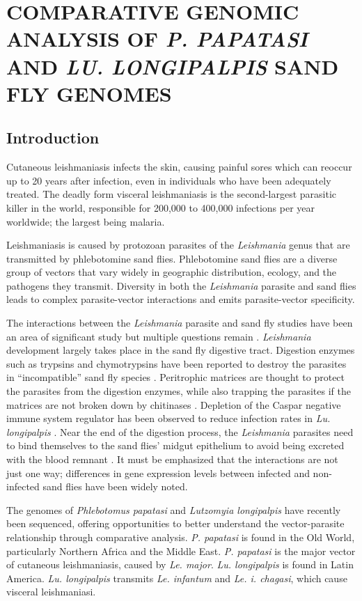 \chapter{\uppercase{Comparative Genomic Analysis of \emph{P. papatasi} and \emph{Lu. longipalpis} Sand Fly Genomes}}

\section{Introduction}
Cutaneous leishmaniasis infects the skin, causing painful sores which can reoccur up to 20 years after infection, even in individuals who have been adequately treated. The deadly form visceral leishmaniasis is the second-largest parasitic killer in the world, responsible for 200,000 to 400,000 infections per year worldwide; the largest being malaria.

Leishmaniasis is caused by protozoan parasites of the \emph{Leishmania} genus that are transmitted by phlebotomine sand flies. Phlebotomine sand flies are a diverse group of vectors that vary widely in geographic distribution, ecology, and the pathogens they transmit. Diversity in both the \emph{Leishmania} parasite and sand flies leads to complex parasite-vector interactions and emits parasite-vector specificity.

The interactions between the \emph{Leishmania} parasite and sand fly studies have been an area of significant study but multiple questions remain \cite{Dostalova2012}.  \emph{Leishmania} development largely takes place in the sand fly digestive tract. Digestion enzymes such as trypsins and chymotrypsins have been reported to destroy the parasites in ``incompatible'' sand fly species \cite{Pimenta1997}.  Peritrophic matrices are thought to protect the parasites from the digestion enzymes, while also trapping the parasites if the matrices are not broken down by chitinases \cite{Pimenta1997}.  Depletion of the Caspar negative immune system regulator has been observed to reduce infection rates in \emph{Lu. longipalpis} \cite{Telleria2012}.  Near the end of the digestion process, the \emph{Leishmania} parasites need to bind themselves to the sand flies' midgut epithelium to avoid being excreted with the blood remnant \cite{Pimenta1994}.  It must be emphasized that the interactions are not just one way; differences in  gene expression levels between infected and non-infected sand flies have been widely noted. 

The genomes of \emph{Phlebotomus papatasi} and \emph{Lutzomyia longipalpis} have recently been sequenced, offering opportunities to better understand the vector-parasite relationship through comparative analysis. \emph{P. papatasi} is found in the Old World, particularly Northern Africa and the Middle East. \emph{P. papatasi} is the major vector of cutaneous leishmaniasis, caused by \emph{Le. major}.  \emph{Lu. longipalpis} is found in Latin America. \emph{Lu. longipalpis} transmits \emph{Le. infantum} and \emph{Le. i. chagasi}, which cause visceral leishmaniasi.

